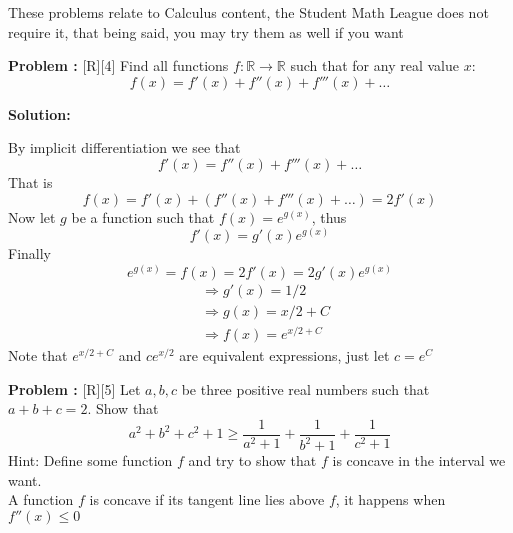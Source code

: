 \documentclass[12pt]{article}
\newcounter{problem}
\newenvironment{problem}{%
    \stepcounter{problem}
    \noindent\textbf{Problem \theproblem:}%
}{%
    \par
}
\newenvironment{solution}{%
    \vspace{1em} %
    \noindent\textbf{Solution:}%
}{%
    \par
}
\begin{document}
\vskip 1cm
These problems relate to Calculus content, the Student Math League does not require it, that being said, you may try them as well if you want
\vskip 1cm

\begin{problem}[R][4]
   Find all functions $f:\mathbb{R} \rightarrow \mathbb{R}$ such that for any real value $x$:
   $$ f(x) = f'(x) + f''(x) + f'''(x) + \ldots $$ 
\end{problem}

\begin{solution}
   By implicit differentiation we see that 
   $$f'(x) = f''(x) + f'''(x) + \ldots$$
   That is
   $$ f(x) = f'(x) + (f''(x) + f'''(x) + \ldots) = 2f'(x) $$
   Now let $g$ be a function such that $f(x) = e^{g(x)}$, thus 
   $$ f'(x) = g'(x)e^{g(x)}$$ 
   \newpage
   Finally 
   $$e^{g(x)} = f(x) = 2f'(x) = 2g'(x)e^{g(x)}$$
   \begin{align*}
       &\Rightarrow g'(x) = 1/2 \\
       &\Rightarrow g(x) = x/2 + C \\
       &\Rightarrow f(x) = e^{x/2+C}
   \end{align*}
   Note that $e^{x/2+C}$ and $ce^{x/2}$ are equivalent expressions, just let $c=e^C$ 
\end{solution}

\begin{problem}[R][5]
    Let $a,b,c$ be three positive real numbers such that $a+b+c=2$. Show that
    $$ a^2+b^2+c^2+1 \geq \frac{1}{a^2+1}+\frac{1}{b^2+1}+\frac{1}{c^2+1}  $$
    Hint: Define some function $f$ and try to show that $f$ is concave in the interval we want. \\
    A function $f$ is concave if its tangent line lies above $f$, it happens when $f''(x)\leq 0$
    \end{problem}
\end{document}
